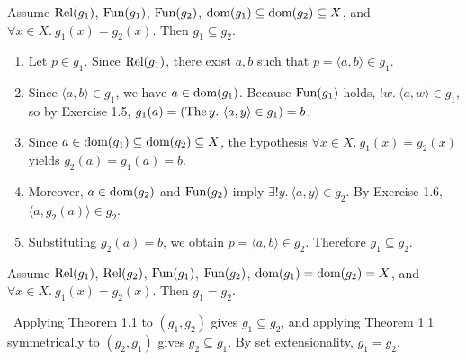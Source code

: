 \documentclass[10pt,a4paper]{article}
\begin{document}
\begin{theorem}
Assume ${\textrm{Rel}}(g_1)$, ${\textrm{Fun}}(g_1)$, ${\textrm{Fun}}(g_2)$, ${\textrm{dom}}(g_1)\subseteq{\textrm{dom}}(g_2)\subseteq X$, and $\forall x\in X.\ g_1(x)=g_2(x)$. Then $g_1\subseteq g_2$.
\end{theorem}
\myprf
\begin{enumerate}
\item Let $p \in g_1$. Since ${\textrm{Rel}}(g_1)$, there exist $a, b$ such that $p = \langle a, b\rangle \in g_1$.
\item Since $\langle a, b\rangle \in g_1$, we have $a \in {\textrm{dom}}(g_1)$. Because ${\textrm{Fun}}(g_1)$ holds, $!w.\ \langle a,w\rangle \in g_1$, so by Exercise 1.5, $g_1(a) = (\The y.\ \langle a,y\rangle \in g_1) = b$.
\item Since $a \in {\textrm{dom}}(g_1) \subseteq {\textrm{dom}}(g_2) \subseteq X$, the hypothesis $\forall x \in X.\ g_1(x) = g_2(x)$ yields $g_2(a) = g_1(a) = b$.
\item Moreover, $a \in {\textrm{dom}}(g_2)$ and ${\textrm{Fun}}(g_2)$ imply $\exists !y.\ \langle a,y\rangle \in g_2$. By Exercise 1.6, $\langle a, g_2(a)\rangle \in g_2$.
\item Substituting $g_2(a) = b$, we obtain $p = \langle a, b\rangle \in g_2$. Therefore $g_1 \subseteq g_2$.
\end{enumerate}
\myqed

\begin{theorem}
Assume ${\textrm{Rel}}(g_1)$, ${\textrm{Rel}}(g_2)$, ${\textrm{Fun}}(g_1)$, ${\textrm{Fun}}(g_2)$, ${\textrm{dom}}(g_1) = {\textrm{dom}}(g_2) = X$, and $\forall x\in X.\ g_1(x)=g_2(x)$. Then $g_1 = g_2$.
\end{theorem}
\myprf\ Applying Theorem 1.1 to $(g_1, g_2)$ gives $g_1 \subseteq g_2$, and applying Theorem 1.1 symmetrically to $(g_2, g_1)$ gives $g_2 \subseteq g_1$. By set extensionality, $g_1 = g_2$. \myqed
\end{document}
